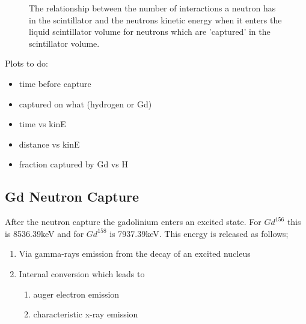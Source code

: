 \begin{figure}[!htbp]%
\centering
{}
\caption{The relationship between the number of interactions a neutron has in the scintillator and the neutrons kinetic energy when it enters the liquid scintillator volume for neutrons which are 'captured' in the scintillator volume.
}
\label{fig:dd_neutron_gdls_distance_vs_number_of_interactions}
\end{figure}



\par
Plots to do:

\begin{itemize}
    \item time before capture
    \item captured on what (hydrogen or Gd)
    \item time vs kinE
    \item distance vs kinE
    \item fraction captured by Gd vs H
\end{itemize}


\subsection{Gd Neutron Capture}
\par
After the neutron capture the gadolinium enters an excited state. 
For $Gd^{156}$ this is 8536.39keV and for $Gd^{158}$ is 7937.39keV.
This energy is released as follows;

\begin{enumerate}
    \item Via gamma-rays emission from the decay of an excited nucleus
    \item Internal conversion which leads to
    \begin{enumerate}
        \item auger electron emission
        \item characteristic x-ray emission
    \end{enumerate}
\end{enumerate}


